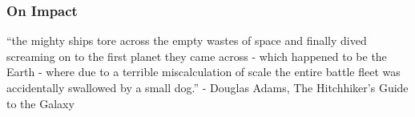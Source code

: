 \begin{frame}
\frametitle{On Impact}

``the mighty ships tore across the empty wastes of space and finally dived screaming on to the first planet they came across - which happened to be the Earth - where due to a terrible miscalculation of scale the entire battle fleet was accidentally swallowed by a small dog.'' - Douglas Adams, The Hitchhiker's Guide to the Galaxy

\end{frame}


